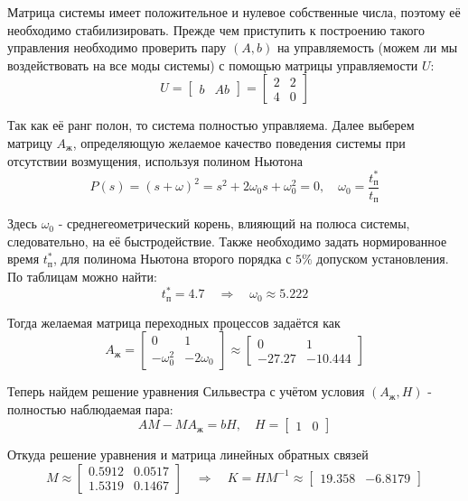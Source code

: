 \documentclass[a4paper,hidelinks,14pt]{extarticle}
\begin{document}
	Матрица системы имеет положительное и нулевое собственные числа, поэтому её необходимо стабилизировать. Прежде чем приступить к построению такого управления необходимо проверить пару $(A, b)$ на управляемость (можем ли мы воздействовать на все моды системы) с помощью матрицы управляемости $U$:
	\[
		U = \begin{bmatrix}
			b & Ab
		\end{bmatrix} = \begin{bmatrix}
			2 & 2\\
			4 & 0
		\end{bmatrix}
	\]

	Так как её ранг полон, то система полностью управляема. Далее выберем матрицу $A_\text{ж}$, определяющую желаемое качество поведения системы при отсутствии возмущения, используя полином Ньютона
	\[
		P(s) = (s + \omega)^2 = s^2 + 2 \omega_0 s + \omega_0^2 = 0, \quad \omega_0 = \frac{t_\text{п}^*}{t_\text{п}}
	\]

	Здесь $\omega_0$ - среднегеометрический корень, влияющий на полюса системы, следовательно, на её быстродействие. Также необходимо задать нормированное время $t_\text{п}^*$, для полинома Ньютона второго порядка с $5\%$ допуском установления. По таблицам можно найти:
	\[
		t_\text{п}^* = 4.7 \quad \Rightarrow \quad \omega_0 \approx 5.222
	\]

	Тогда желаемая матрица переходных процессов задаётся как
	\[
		A_\text{ж} = \begin{bmatrix}
			0 & 1 \\
			-\omega_0^2 & -2 \omega_0
		\end{bmatrix} \approx \begin{bmatrix}
			0 & 1 \\
			-27.27 & -10.444
		\end{bmatrix}
	\]
	
	Теперь найдем решение уравнения Сильвестра с учётом условия $(A_\text{ж}, H)$ - полностью наблюдаемая пара:
	\[
		A M - M A_\text{ж} = b H, \quad H = \begin{bmatrix}
			1 & 0
		\end{bmatrix}
	\]

	Откуда решение уравнения и матрица линейных обратных связей
	\begin{equation}
		M \approx \begin{bmatrix}
			0.5912  &  0.0517 \\
			1.5319  &  0.1467
		\end{bmatrix} \quad \Rightarrow \quad K = H M^{-1} \approx \begin{bmatrix}
			19.358 & -6.8179
		\end{bmatrix}
	\end{equation}
\end{document}
